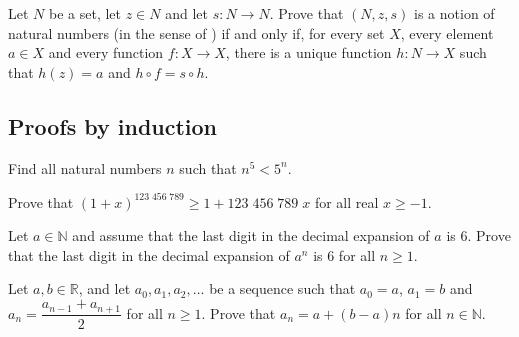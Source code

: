 \begin{chapex}
Let $N$ be a set, let $z \in N$ and let $s : N \to N$. Prove that $(N, z, s)$ is a notion of natural numbers (in the sense of ) if and only if, for every set $X$, every element $a \in X$ and every function $f : X \to X$, there is a unique function $h : N \to X$ such that $h(z)=a$ and $h \circ f = s \circ h$.
\end{chapex}

\subsection*{Proofs by induction}

\begin{chapex}
\label{cqNPowerFiveLessThanFivePowerN}
Find all natural numbers $n$ such that $n^5 < 5^n$.
\end{chapex}

\begin{chapex}
Prove that $(1+x)^{123\;456\;789} \ge 1 + 123\;456\;789\;x$ for all real $x \ge -1$.
\end{chapex}

\begin{chapex}
Let $a \in \mathbb{N}$ and assume that the last digit in the decimal expansion of $a$ is $6$. Prove that the last digit in the decimal expansion of $a^n$ is $6$ for all $n \ge 1$.
\end{chapex}

\begin{chapex}
Let $a,b \in \mathbb{R}$, and let $a_0, a_1, a_2, \dots$ be a sequence such that $a_0 = a$, $a_1=b$ and $a_n = \dfrac{a_{n-1} + a_{n+1}}{2}$ for all $n \ge 1$. Prove that $a_n = a + (b-a) n$ for all $n \in \mathbb{N}$.
\end{chapex}

